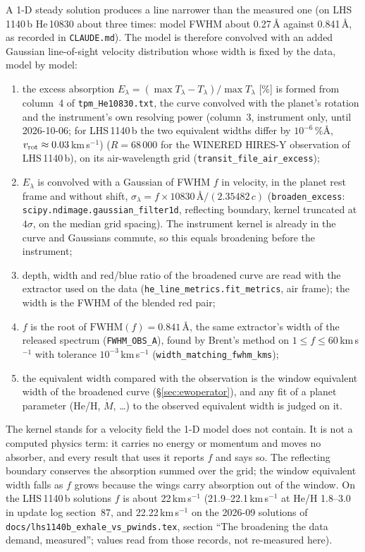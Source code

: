 \documentclass[english,a4paper]{my_memo}
\begin{document}
A 1-D steady solution produces a line narrower than the measured one (on
LHS\,1140\,b He\,10830 about three times: model FWHM about 0.27\,\AA{}
against 0.841\,\AA{}, as recorded in \texttt{CLAUDE.md}). The model is
therefore convolved with an added Gaussian line-of-sight velocity
distribution whose width is fixed by the data, model by model:
\begin{enumerate}
  \item the excess absorption $E_\lambda = (\max T_\lambda -
    T_\lambda)/\max T_\lambda$ [\%] is formed from column~4 of
    \texttt{tpm\_He10830.txt}, the curve convolved with the planet's rotation
    and the instrument's own resolving power (column~3, instrument only, until
    2026-10-06; for LHS\,1140\,b the two equivalent widths differ by
    $10^{-6}$\,\%\AA{}, $v_{\rm rot}\approx0.03$\,km\,s$^{-1}$) ($R = 68\,000$ for the WINERED HIRES-Y observation of
    LHS\,1140\,b), on its air-wavelength grid
    (\texttt{transit\_file\_air\_excess});
  \item $E_\lambda$ is convolved with a Gaussian of FWHM $f$ in velocity,
    in the planet rest frame and without shift,
    $\sigma_\lambda = f\times10830\,\text{\AA}/(2.35482\,c)$
    (\texttt{broaden\_excess}: \texttt{scipy.ndimage.gaussian\_filter1d},
    reflecting boundary, kernel truncated at $4\sigma$, on the median grid
    spacing). The instrument kernel is already in the curve and Gaussians
    commute, so this equals broadening before the instrument;
  \item depth, width and red/blue ratio of the broadened curve are read with
    the extractor used on the data (\texttt{he\_line\_metrics.fit\_metrics},
    air frame); the width is the FWHM of the blended red pair;
  \item $f$ is the root of $\mathrm{FWHM}(f) = 0.841$\,\AA{}, the same
    extractor's width of the released spectrum (\texttt{FWHM\_OBS\_A}),
    found by Brent's method on $1 \le f \le 60$\,km\,s$^{-1}$ with tolerance
    $10^{-3}$\,km\,s$^{-1}$ (\texttt{width\_matching\_fwhm\_kms});
  \item the equivalent width compared with the observation is the window
    equivalent width of the broadened curve (\S\ref{sec:ewoperator}), and
    any fit of a planet parameter (He/H, $\dot M$, \ldots) to the observed
    equivalent width is judged on it.
\end{enumerate}
The kernel stands for a velocity field the 1-D model does not contain. It is
not a computed physics term: it carries no energy or momentum and moves no
absorber, and every result that uses it reports $f$ and says so. The
reflecting boundary conserves the absorption summed over the grid; the window
equivalent width falls as $f$ grows because the wings carry absorption out of
the window. On the LHS\,1140\,b solutions $f$ is about 22\,km\,s$^{-1}$
(21.9--22.1\,km\,s$^{-1}$ at He/H 1.8--3.0 in update log section~87, and
22.22\,km\,s$^{-1}$ on the 2026-09 solutions of
\texttt{docs/lhs1140b\_exhale\_vs\_pwinds.tex},
section ``The broadening the data demand, measured''; values read from
those records, not re-measured here).
\end{document}
